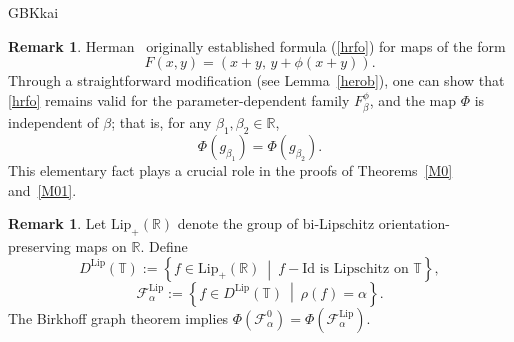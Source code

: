\documentclass{amsart}
\newcommand{\al}{\alpha}
\theoremstyle{definition}
\newtheorem{Remark}[Definition]{Remark}
\begin{document}
\begin{CJK*}{GBK}{kai}
\begin{Remark}
Herman~\cite{H1} originally established formula (\ref{hrfo}) for maps of the form
\[
F(x,y) = (x + y,\, y + \phi(x + y)).
\]
Through a straightforward modification (see Lemma~\ref{herob}), one can show that \eqref{hrfo} remains valid for the parameter-dependent family \( F_\beta^{\phi} \), and the map \( \Phi \) is independent of \( \beta \); that is, for any \( \beta_1, \beta_2 \in \mathbb{R} \),
\[
\Phi(g_{\beta_1}) = \Phi(g_{\beta_2}).
\]
This elementary fact plays a crucial role in the proofs of Theorems~\ref{M0} and~\ref{M01}.
	\end{Remark}
		\begin{Remark}
			Let \( \mathrm{Lip}_+(\mathbb{R}) \) denote the group of bi-Lipschitz orientation-preserving maps on \( \mathbb{R} \). Define
			\[
			D^{\mathrm{Lip}}(\mathbb{T}) := \left\{ f \in \mathrm{Lip}_+(\mathbb{R})\ \middle|\ f - \mathrm{Id} \text{ is Lipschitz on } \mathbb{T} \right\},
			\]
			\[
			\mathcal{F}_\al^{\mathrm{Lip}} := \left\{ f \in D^{\mathrm{Lip}}(\mathbb{T})\ \middle|\ \rho(f) = \alpha \right\}.
			\]
			The Birkhoff graph theorem implies $\Phi(\mathcal{F}_\al^0) = \Phi(\mathcal{F}_\al^{\mathrm{Lip}})$.
			\end{Remark}	
		

\end{CJK*}
\end{document}
